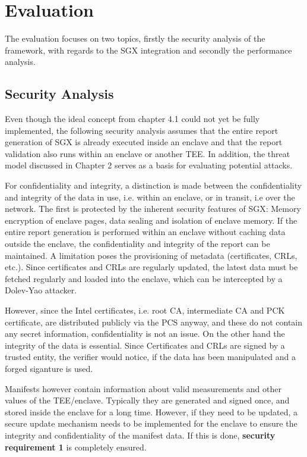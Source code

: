 
\chapter{Evaluation}\label{chapter:evaluation}
The evaluation focuses on two topics, firstly the security analysis of the framework, with regards to the SGX integration and secondly the performance analysis.

\section{Security Analysis}
Even though the ideal concept from chapter 4.1 could not yet be fully implemented, the following security analysis assumes that the entire report generation of SGX is already executed inside an enclave and that the report validation also runs within an enclave or another TEE.
In addition, the threat model discussed in Chapter 2 serves as a basis for evaluating potential attacks. 

For confidentiality and integrity, a distinction is made between the confidentiality and integrity of the data in use, i.e. within an enclave, or in transit, i.e over the network. The first is protected by the inherent security features of SGX: Memory encryption of enclave pages, data sealing and isolation of enclave memory. If the entire report generation is performed within an enclave without caching data outside the enclave, the confidentiality and integrity of the report can be maintained. A limitation poses the provisioning of metadata (certificates, CRLs, etc.). Since certificates and CRLs are regularly updated, the latest data must be fetched regularly and loaded into the enclave, which can be intercepted by a Dolev-Yao attacker.

However, since the Intel certificates, i.e. root CA, intermediate CA and PCK certificate, are distributed publicly via the PCS anyway, and these do not contain any secret information, confidentiality is not an issue. On the other hand the integrity of the data is essential. Since Certificates and CRLs are signed by a trusted entity, the verifier would notice, if the data has been manipulated and a forged siganture is used. 

Manifests however contain information about valid measurements and other values of the TEE/enclave. Typically they are generated and signed once, and stored inside the enclave for a long time. However, if they need to be updated, a secure update mechanism needs to be implemented for the enclave to ensure the integrity and confidentiality of the manifest data. If this is done, \textbf{security requirement 1} is completely ensured.

